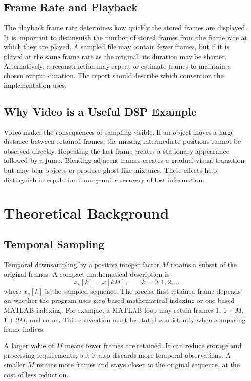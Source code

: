 \documentclass[12pt,a4paper,oneside]{report}
\begin{document}
\section{Frame Rate and Playback}
The playback frame rate determines how quickly the stored frames are displayed. It is important to distinguish the number of stored frames from the frame rate at which they are played. A sampled file may contain fewer frames, but if it is played at the same frame rate as the original, its duration may be shorter. Alternatively, a reconstruction may repeat or estimate frames to maintain a chosen output duration. The report should describe which convention the implementation uses.

\section{Why Video is a Useful DSP Example}
Video makes the consequences of sampling visible. If an object moves a large distance between retained frames, the missing intermediate positions cannot be observed directly. Repeating the last frame creates a stationary appearance followed by a jump. Blending adjacent frames creates a gradual visual transition but may blur objects or produce ghost-like mixtures. These effects help distinguish interpolation from genuine recovery of lost information.

\chapter{Theoretical Background}
\section{Temporal Sampling}
Temporal downsampling by a positive integer factor $M$ retains a subset of the original frames. A compact mathematical description is
\[
x_s[k] = x[kM], \qquad k=0,1,2,\ldots
\]
where $x_s[k]$ is the sampled sequence. The precise first retained frame depends on whether the program uses zero-based mathematical indexing or one-based MATLAB indexing. For example, a MATLAB loop may retain frames 1, $1+M$, $1+2M$, and so on. This convention must be stated consistently when comparing frame indices.

A larger value of $M$ means fewer frames are retained. It can reduce storage and processing requirements, but it also discards more temporal observations. A smaller $M$ retains more frames and stays closer to the original sequence, at the cost of less reduction.
\end{document}

